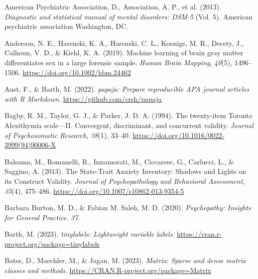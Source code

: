 \documentclass[
  man,floatsintext]{apa7}
\newlength{\cslhangindent}
\newlength{\cslentryspacingunit} %
\newenvironment{CSLReferences}[2] %
 {%
  \setlength{\parindent}{0pt}
  \ifodd #1
  \let\oldpar\par
  \def\par{\hangindent=\cslhangindent\oldpar}
  \fi
  \setlength{\parskip}{#2\cslentryspacingunit}
 }%
 {}
\begin{document}
\hypertarget{refs}{}
\begin{CSLReferences}{1}{0}
\leavevmode{}%
American Psychiatric Association, D., Association, A. P., et al. (2013). \emph{Diagnostic and statistical manual of mental disorders: DSM-5} (Vol. 5). American psychiatric association Washington, DC.

\leavevmode{}%
Anderson, N. E., Harenski, K. A., Harenski, C. L., Koenigs, M. R., Decety, J., Calhoun, V. D., \& Kiehl, K. A. (2019). Machine learning of brain gray matter differentiates sex in a large forensic sample. \emph{Human Brain Mapping}, \emph{40}(5), 1496--1506. \url{https://doi.org/10.1002/hbm.24462}

\leavevmode{}%
Aust, F., \& Barth, M. (2022). \emph{{papaja}: {Prepare} reproducible {APA} journal articles with {R Markdown}}. \url{https://github.com/crsh/papaja}

\leavevmode{}%
Bagby, R. M., Taylor, G. J., \& Parker, J. D. A. (1994). The twenty-item {Toronto Alexithymia} scale---{II}. {Convergent}, discriminant, and concurrent validity. \emph{Journal of Psychosomatic Research}, \emph{38}(1), 33--40. \url{https://doi.org/10.1016/0022-3999(94)90006-X}

\leavevmode{}%
Balsamo, M., Romanelli, R., Innamorati, M., Ciccarese, G., Carlucci, L., \& Saggino, A. (2013). The {State-Trait Anxiety Inventory}: {Shadows} and {Lights} on its {Construct Validity}. \emph{Journal of Psychopathology and Behavioral Assessment}, \emph{35}(4), 475--486. \url{https://doi.org/10.1007/s10862-013-9354-5}

\leavevmode{}%
Barbara Burton, M. D., \& Fabian M. Saleh, M. D. (2020). \emph{Psychopathy: {Insights} for {General Practice}}. \emph{37}.

\leavevmode{}%
Barth, M. (2023). \emph{{tinylabels}: Lightweight variable labels}. \url{https://cran.r-project.org/package=tinylabels}

\leavevmode{}%
Bates, D., Maechler, M., \& Jagan, M. (2023). \emph{Matrix: Sparse and dense matrix classes and methods}. \url{https://CRAN.R-project.org/package=Matrix}


\end{CSLReferences}
\end{document}
